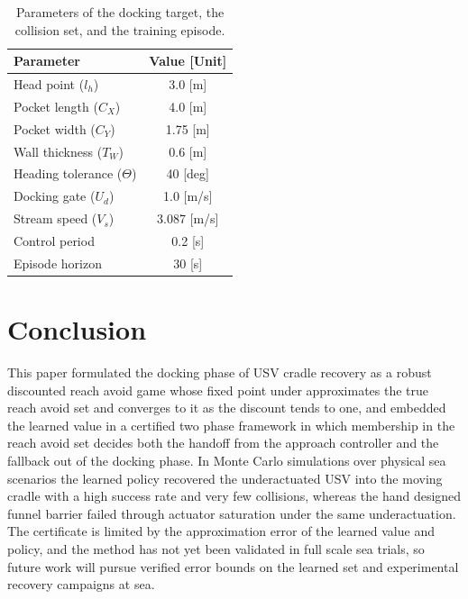 \documentclass[5p,times,authoryear]{elsarticle}
\begin{document}
\begin{table}[t]
\centering
\renewcommand{\arraystretch}{1.2}
\caption{Parameters of the docking target, the collision set, and the training episode.}
\label{tab_set}
\begin{tabular}{lc}
\hline
\textbf{Parameter} & \textbf{Value [Unit]} \\ \hline
Head point ($l_h$)           & 3.0 [m]      \\
Pocket length ($C_X$)        & 4.0 [m]      \\
Pocket width ($C_Y$)         & 1.75 [m]     \\
Wall thickness ($T_W$)       & 0.6 [m]      \\
Heading tolerance ($\Theta$) & 40 [deg]     \\
Docking gate ($U_d$)         & 1.0 [m/s]    \\
Stream speed ($V_s$)         & 3.087 [m/s]  \\
Control period               & 0.2 [s]      \\
Episode horizon              & 30 [s]       \\
\hline
\end{tabular}
\end{table}




\section{Conclusion}\label{sec_conclusion}

This paper formulated the docking phase of USV cradle recovery as a robust discounted reach avoid game whose fixed point under approximates the true reach avoid set and converges to it as the discount tends to one, and embedded the learned value in a certified two phase framework in which membership in the reach avoid set decides both the handoff from the approach controller and the fallback out of the docking phase. In Monte Carlo simulations over physical sea scenarios the learned policy recovered the underactuated USV into the moving cradle with a high success rate and very few collisions, whereas the hand designed funnel barrier failed through actuator saturation under the same underactuation. The certificate is limited by the approximation error of the learned value and policy, and the method has not yet been validated in full scale sea trials, so future work will pursue verified error bounds on the learned set and experimental recovery campaigns at sea.
\end{document}
